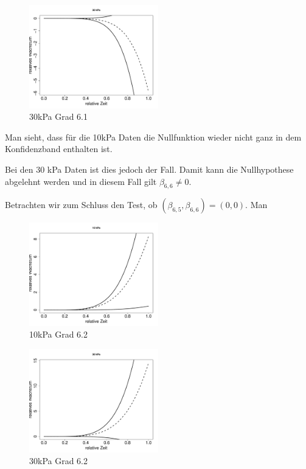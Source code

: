 \documentclass[12pt,a4paper]{article}
\theoremstyle{definition}
\theoremstyle{definition}
\theoremstyle{definition}
\theoremstyle{definition}
\begin{document}
\begin{figure}[H] 
  \centering
     \includegraphics[width=0.5\textwidth]{30kPa-Grad-6-1-KB}
  \caption{30kPa Grad 6.1}
  \label{30kPa Grad 6.1}
\end{figure}

Man sieht, dass für die 10kPa Daten die Nullfunktion wieder nicht ganz in dem Konfidenzband enthalten ist.

Bei den 30 kPa Daten ist dies jedoch der Fall. Damit kann die Nullhypothese abgelehnt werden und in diesem Fall gilt $\beta_{6,6} \neq 0$.

Betrachten wir zum Schluss den Test, ob $(\beta_{6,5}, \beta_{6,6}) = (0,0)$. Man 

\begin{figure}[H] 
  \centering
     \includegraphics[width=0.5\textwidth]{10kPa-Grad-6-2-KB}
  \caption{10kPa Grad 6.2}
  \label{10kPa Grad 6.2}
\end{figure}

\begin{figure}[H] 
  \centering
     \includegraphics[width=0.5\textwidth]{30kPa-Grad-6-2-KB}
  \caption{30kPa Grad 6.2}
  \label{30kPa Grad 6.2}
\end{figure}
\end{document}
